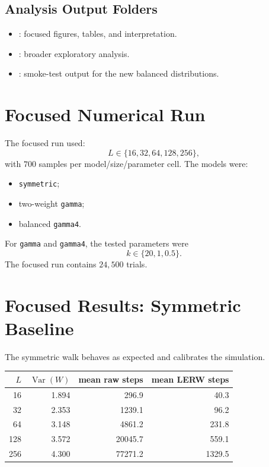 \documentclass[11pt]{article}
\begin{document}
\subsection{Analysis Output Folders}

\begin{itemize}
  \item {}: focused figures, tables, and interpretation.
  \item {}: broader exploratory analysis.
  \item {}: smoke-test output for the new balanced
        distributions.
\end{itemize}

\section{Focused Numerical Run}

The focused run used:
\[
  L \in \{16,32,64,128,256\},
\]
with $700$ samples per model/size/parameter cell. The models were:
\begin{itemize}
  \item \texttt{symmetric};
  \item two-weight \texttt{gamma};
  \item balanced \texttt{gamma4}.
\end{itemize}
For \texttt{gamma} and \texttt{gamma4}, the tested parameters were
\[
  k \in \{20,1,0.5\}.
\]
The focused run contains $24{,}500$ trials.

\section{Focused Results: Symmetric Baseline}

The symmetric walk behaves as expected and calibrates the simulation.

\begin{center}
\begin{tabular}{rrrr}
\toprule
$L$ & $\operatorname{Var}(W)$ & mean raw steps & mean LERW steps \\
\midrule
16  & 1.894 & 296.9   & 40.3 \\
32  & 2.353 & 1239.1  & 96.2 \\
64  & 3.148 & 4861.2  & 231.8 \\
128 & 3.572 & 20045.7 & 559.1 \\
256 & 4.300 & 77271.2 & 1329.5 \\
\bottomrule
\end{tabular}
\end{center}
\end{document}
